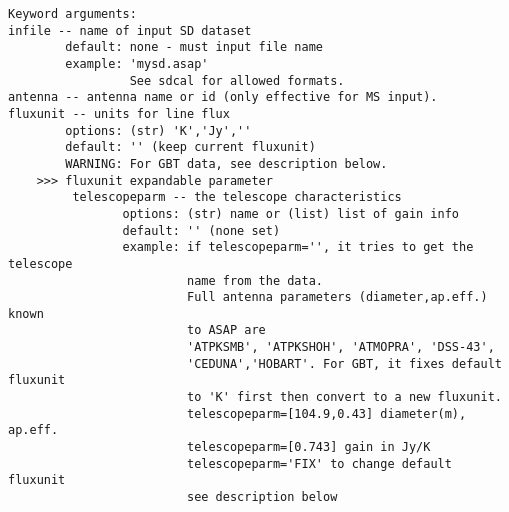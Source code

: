\begin{verbatim}
Keyword arguments:
infile -- name of input SD dataset
        default: none - must input file name
        example: 'mysd.asap'
                 See sdcal for allowed formats.
antenna -- antenna name or id (only effective for MS input). 
fluxunit -- units for line flux
        options: (str) 'K','Jy',''
        default: '' (keep current fluxunit)
        WARNING: For GBT data, see description below.
    >>> fluxunit expandable parameter
         telescopeparm -- the telescope characteristics
                options: (str) name or (list) list of gain info
                default: '' (none set)
                example: if telescopeparm='', it tries to get the telescope
                         name from the data.
                         Full antenna parameters (diameter,ap.eff.) known
                         to ASAP are
                         'ATPKSMB', 'ATPKSHOH', 'ATMOPRA', 'DSS-43',
                         'CEDUNA','HOBART'. For GBT, it fixes default fluxunit
                         to 'K' first then convert to a new fluxunit.
                         telescopeparm=[104.9,0.43] diameter(m), ap.eff.
                         telescopeparm=[0.743] gain in Jy/K
                         telescopeparm='FIX' to change default fluxunit
                         see description below


\end{verbatim}
